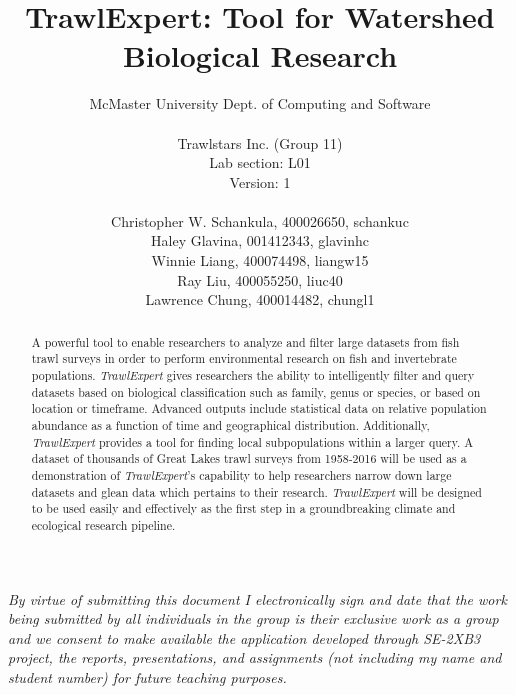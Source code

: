 \documentclass{article}
\begin{document}
\title{TrawlExpert: Tool for Watershed Biological Research}
\author{McMaster University Dept. of Computing and Software \\ \\ Trawlstars Inc. (Group 11) \\ Lab section: L01  \\ Version: 1 \\ \\ Christopher W. Schankula, 400026650, schankuc \\ Haley Glavina, 001412343, glavinhc \\ Winnie Liang, 400074498, liangw15 \\ Ray Liu, 400055250, liuc40 \\ Lawrence Chung, 400014482, chungl1}

\maketitle

\noindent\textit{By virtue of submitting this document I electronically sign and date that the work being submitted by all individuals in the group is their exclusive work as a group and we consent to make available the application developed through SE-2XB3 project, the reports, presentations, and assignments (not including my name and student number) for future teaching purposes.}

\newpage

\begin{abstract}
\noindent A powerful tool to enable researchers to analyze and filter large datasets from fish trawl surveys in order to perform environmental research on fish and invertebrate populations. \textit{TrawlExpert} gives researchers the ability to intelligently filter and query datasets based on biological classification such as family, genus or species, or based on location or timeframe. Advanced outputs include statistical data on relative population abundance as a function of time and geographical distribution. Additionally, \textit{TrawlExpert} provides a tool for finding local subpopulations within a larger query. A dataset of thousands of Great Lakes trawl surveys from 1958-2016 will be used as a demonstration of \textit{TrawlExpert}'s capability to help researchers narrow down large datasets and glean data which pertains to their research. \textit{TrawlExpert} will be designed to be used easily and effectively as the first step in a groundbreaking climate and ecological research pipeline.
\end{abstract}
\end{document}

